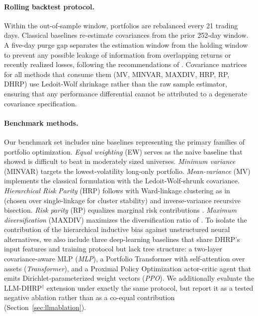 \paragraph{Rolling backtest protocol.} Within the out-of-sample window, portfolios are rebalanced every 21 trading days. Classical baselines re-estimate covariances from the prior 252-day window. A five-day purge gap separates the estimation window from the holding window to prevent any possible leakage of information from overlapping returns or recently realized losses, following the recommendations of \citet{LopezdePrado2018}. Covariance matrices for all methods that consume them (MV, MINVAR, MAXDIV, HRP, RP, DHRP) use Ledoit-Wolf shrinkage \citep{Ledoit2004} rather than the raw sample estimator, ensuring that any performance differential cannot be attributed to a degenerate covariance specification.

\paragraph{Benchmark methods.} Our benchmark set includes nine baselines representing the primary families of portfolio optimization. \emph{Equal weighting} (EW) serves as the naive baseline that \citet{DeMiguel2009} showed is difficult to beat in moderately sized universes. \emph{Minimum variance} (MINVAR) targets the lowest-volatility long-only portfolio. \emph{Mean-variance} (MV) implements the classical \citet{Markowitz1952} formulation with the Ledoit-Wolf-shrunk covariance. \emph{Hierarchical Risk Parity} (HRP) follows \citet{LopezdePrado2016} with Ward-linkage clustering as in \citet{Raffinot2018} (chosen over single-linkage for cluster stability) and inverse-variance recursive bisection. \emph{Risk parity} (RP) equalizes marginal risk contributions \citep{Maillard2010}. \emph{Maximum diversification} (MAXDIV) maximizes the diversification ratio of \citet{Choueifaty2008}. To isolate the contribution of the hierarchical inductive bias against unstructured neural alternatives, we also include three deep-learning baselines that share DHRP's input features and training protocol but lack tree structure: a two-layer covariance-aware MLP (\emph{MLP}), a Portfolio Transformer with self-attention over assets \citep{KisielGorse2022} (\emph{Transformer}), and a Proximal Policy Optimization actor-critic agent \citep{Schulman2017} that emits Dirichlet-parameterized weight vectors (\emph{PPO}). We additionally evaluate the LLM-DHRP$^{\dagger}$ extension under exactly the same protocol, but report it as a tested negative ablation rather than as a co-equal contribution (Section~\ref{sec:llmablation}).

